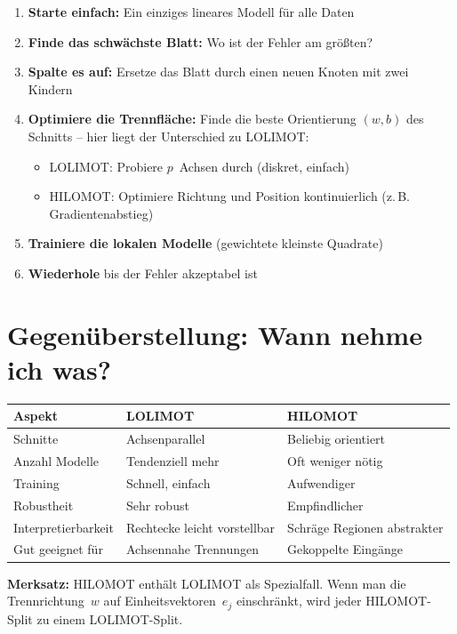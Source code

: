 \documentclass[12pt,a4paper]{article}
\begin{document}
\begin{enumerate}
  \item \textbf{Starte einfach:} Ein einziges lineares Modell für alle Daten
  \item \textbf{Finde das schwächste Blatt:} Wo ist der Fehler am größten?
  \item \textbf{Spalte es auf:} Ersetze das Blatt durch einen neuen Knoten mit zwei Kindern
  \item \textbf{Optimiere die Trennfläche:} Finde die beste Orientierung $(w, b)$ des Schnitts -- hier liegt der Unterschied zu LOLIMOT:
  \begin{itemize}
    \item LOLIMOT: Probiere $p$~Achsen durch (diskret, einfach)
    \item HILOMOT: Optimiere Richtung und Position kontinuierlich (z.\,B. Gradientenabstieg)
  \end{itemize}
  \item \textbf{Trainiere die lokalen Modelle} (gewichtete kleinste Quadrate)
  \item \textbf{Wiederhole} bis der Fehler akzeptabel ist
\end{enumerate}

\section{Gegenüberstellung: Wann nehme ich was?}

\begin{center}
\begin{tabular}{lll}
\toprule
\textbf{Aspekt} & \textbf{LOLIMOT} & \textbf{HILOMOT} \\
\midrule
Schnitte & Achsenparallel & Beliebig orientiert \\
Anzahl Modelle & Tendenziell mehr & Oft weniger nötig \\
Training & Schnell, einfach & Aufwendiger \\
Robustheit & Sehr robust & Empfindlicher \\
Interpretierbarkeit & Rechtecke leicht vorstellbar & Schräge Regionen abstrakter \\
Gut geeignet für & Achsennahe Trennungen & Gekoppelte Eingänge \\
\bottomrule
\end{tabular}
\end{center}

\begin{mdframed}
\textbf{Merksatz:} HILOMOT enthält LOLIMOT als Spezialfall. Wenn man die Trennrichtung~$w$ auf Einheitsvektoren~$e_j$ einschränkt, wird jeder HILOMOT-Split zu einem LOLIMOT-Split.
\end{mdframed}
\end{document}
